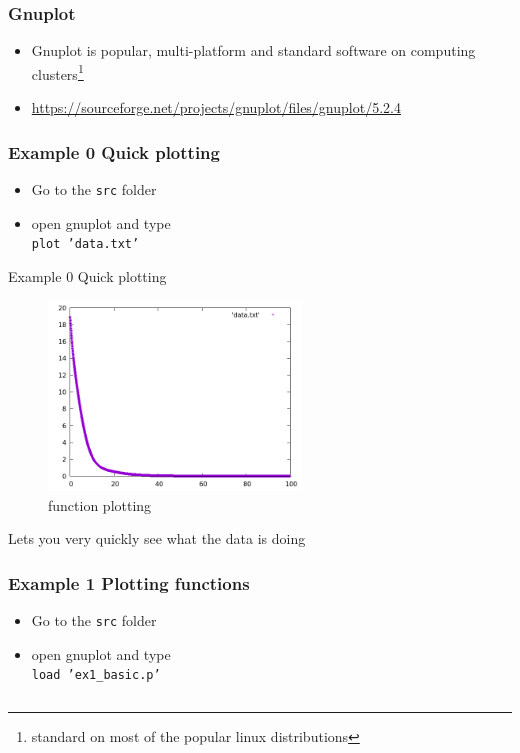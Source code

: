 \documentclass{beamer}
\begin{document}
\begin{frame}
\frametitle{Gnuplot} 
\begin{itemize}
	\item Gnuplot is popular, multi-platform and standard software on computing clusters\footnote{standard on most of the popular linux distributions} 
    \item \url{https://sourceforge.net/projects/gnuplot/files/gnuplot/5.2.4}
\end{itemize}
\end{frame}

\begin{frame}[fragile]
    \frametitle{Example 0 Quick plotting}
\begin{itemize}
	\item Go to the \texttt{src} folder
    \item open gnuplot and type \\ \texttt{plot 'data.txt'}
\end{itemize}
\end{frame}

\begin{frame}{Example 0 Quick plotting}
    \begin{figure}
	\centering
	\includegraphics[width=0.6\textwidth]{src/data.png}
	\caption{function plotting}
	\label{fig:function}
\end{figure}
Lets you very quickly see what the data is doing
\end{frame}

\begin{frame}[fragile]
    \frametitle{Example 1 Plotting functions}
\begin{itemize}
	\item Go to the \texttt{src} folder
    \item open gnuplot and type \\ \texttt{load 'ex1\_basic.p'}
\end{itemize}
\inputminted{bash}{src/ex1_basic.p}
\end{frame}
\end{document}
